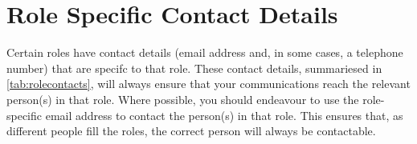 \chapter{Role Specific Contact Details}
Certain roles have contact details (email address and, in some cases, a telephone number) that are specifc to that role. These contact details, summariesed in \autoref{tab:rolecontacts}, will always ensure that your communications reach the relevant person(s) in that role. Where possible, you should endeavour to use the role-specific email address to contact the person(s) in that role. This ensures that, as different people fill the roles, the correct person will always be contactable.
\begin{landscape}
\end{landscape}
